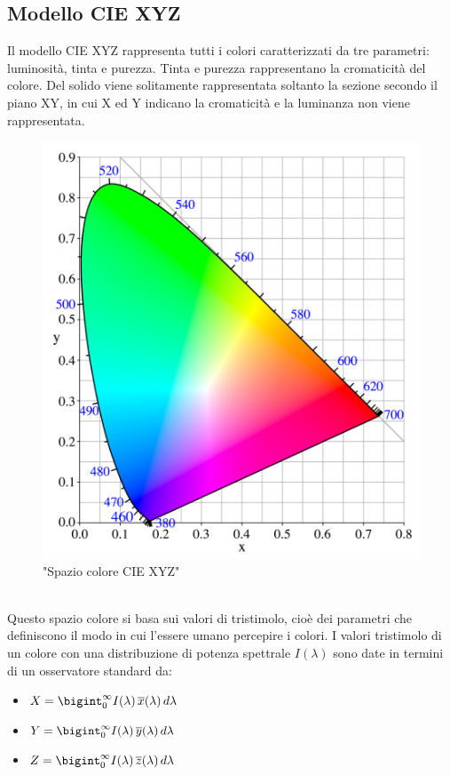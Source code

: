 \documentclass[a4paper,11pt]{article}
\begin{document}
        \subsection{Modello CIE XYZ}
        Il modello CIE XYZ rappresenta tutti i colori caratterizzati da tre parametri: luminosità, tinta e purezza. Tinta e purezza rappresentano la cromaticità del colore. 
        Del solido viene solitamente rappresentata soltanto la sezione secondo il piano XY, in cui X ed Y indicano la cromaticità e la luminanza non viene rappresentata.
        \begin{figure}[h]
            \centering
            \includegraphics[scale=0.2]{CIEXYZ.png}
            \caption{"Spazio colore CIE XYZ"}
        \end{figure}
        \\Questo spazio colore si basa sui valori di tristimolo, cioè dei parametri che definiscono il modo in cui l'essere umano percepire i colori. 
        I valori tristimolo di un colore con una distribuzione di potenza spettrale $ I(\lambda)$  sono date in termini di un osservatore standard da:

        \begin{itemize}      
            \item[] \Large $X = \bigint_0^\infty I(\lambda)\,\overline{x}(\lambda)\,d\lambda$
            \item[] \Large $Y = \bigint_0^\infty I(\lambda)\,\overline{y}(\lambda)\,d\lambda$
            \item[] \Large $Z = \bigint_0^\infty I(\lambda)\,\overline{z}(\lambda)\,d\lambda$
        \end{itemize}
        
\end{document}
